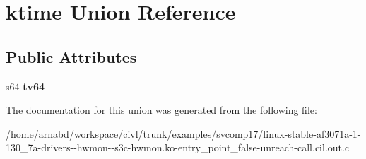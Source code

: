 \hypertarget{unionktime}{}\section{ktime Union Reference}
\label{unionktime}
\subsection*{Public Attributes}
\begin{DoxyCompactItemize}
\item 
\hypertarget{unionktime_a9e0e10bb0a01215c575bc664416b1c33}{}s64 {\bfseries tv64}\label{unionktime_a9e0e10bb0a01215c575bc664416b1c33}

\end{DoxyCompactItemize}


The documentation for this union was generated from the following file\+:\begin{DoxyCompactItemize}
\item 
/home/arnabd/workspace/civl/trunk/examples/svcomp17/linux-\/stable-\/af3071a-\/1-\/130\+\_\+7a-\/drivers-\/-\/hwmon-\/-\/s3c-\/hwmon.\+ko-\/entry\+\_\+point\+\_\+false-\/unreach-\/call.\+cil.\+out.\+c\end{DoxyCompactItemize}
